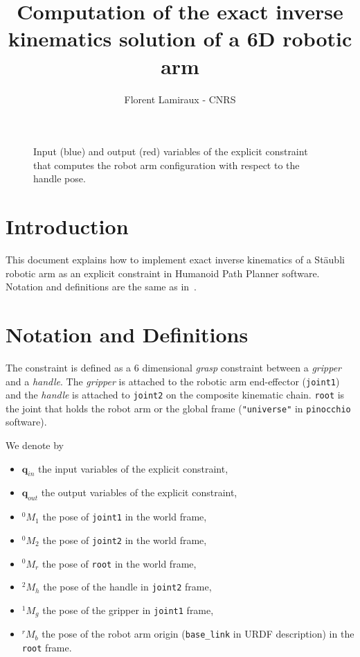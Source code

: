 \documentclass{article}
\title{Computation of the exact inverse kinematics solution of a 6D robotic arm}
\author{Florent Lamiraux - CNRS}
\newcommand\conf{\mathbf{q}}
\begin{document}
\maketitle

\begin{figure}
  \begin{center}
    \def\svgwidth {.6\linewidth}
    \graphicspath{{./figures/}}
    
  \end{center}
  \caption{Input (blue) and output (red) variables of the explicit constraint that computes the robot arm configuration with respect to the handle pose.}
  \label{fig:kinematic-chain}
\end{figure}

\section{Introduction}

This document explains how to implement exact inverse kinematics of a Stäubli robotic arm as an
explicit constraint in Humanoid Path Planner software. Notation and definitions are the same as
in~\cite{lamiraux:hal-02995125}.

\section{Notation and Definitions}

The constraint is defined as a 6 dimensional \textit{grasp} constraint between a \textit{gripper} and a
\textit{handle}. The \textit{gripper} is attached to the robotic arm end-effector (\texttt{joint1}) and the \textit{handle} is attached to \texttt{joint2} on the composite kinematic chain. \texttt{root} is the joint that holds the robot arm or the global frame (\texttt{"universe"} in \texttt{pinocchio} software).

We denote by
\begin{itemize}
\item $\conf_{in}$ the input variables of the explicit constraint,
\item $\conf_{out}$ the output variables of the explicit constraint,
\item $^0M_1$ the pose of \texttt{joint1} in the world frame,
\item $^0M_2$ the pose of \texttt{joint2} in the world frame,
\item $^0M_r$ the pose of \texttt{root} in the world frame,
\item $^2M_h$ the pose of the handle in \texttt{joint2} frame,
\item $^1M_g$ the pose of the gripper in \texttt{joint1} frame,
\item $^rM_b$ the pose of the robot arm origin (\texttt{base\_link} in URDF
  description) in the \texttt{root} frame.
\end{itemize}
\end{document}
